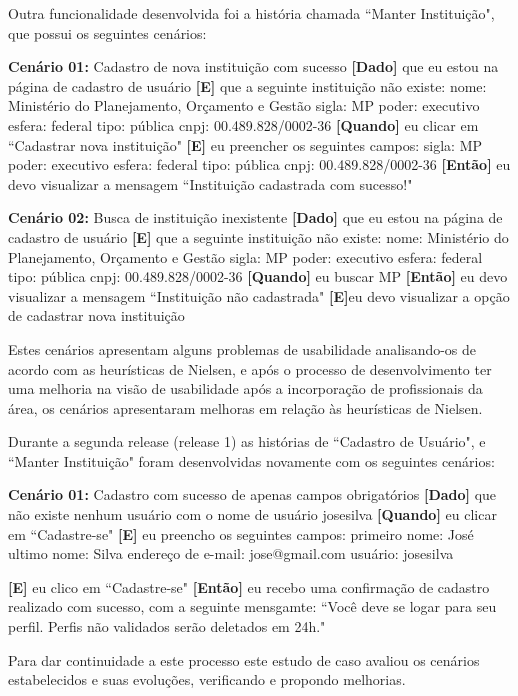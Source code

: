 Outra funcionalidade desenvolvida foi a história chamada ``Manter Instituição", que possui os seguintes cenários:

\textbf{Cenário 01:} Cadastro de nova instituição com sucesso
\textbf{[Dado]} que eu estou na página de cadastro de usuário
\textbf{[E]} que a seguinte instituição não existe:
  	nome: Ministério do Planejamento, Orçamento e Gestão
  	sigla: MP
 	poder: executivo
 	esfera: federal
  	tipo: pública
  	cnpj: 00.489.828/0002-36
\textbf{[Quando]} eu clicar em ``Cadastrar nova instituição" 
\textbf{[E]} eu preencher os seguintes campos:
  	sigla: MP
  	poder: executivo
  	esfera: federal
  	tipo: pública
  	cnpj: 00.489.828/0002-36
\textbf{[Então]} eu devo visualizar a mensagem ``Instituição cadastrada com sucesso!"

\textbf{Cenário 02:} Busca de instituição inexistente
\textbf{[Dado]} que eu estou na página de cadastro de usuário
\textbf{[E]} que a seguinte instituição não existe:
  nome: Ministério do Planejamento, Orçamento e Gestão
  sigla: MP
  poder: executivo
  esfera: federal
  tipo: pública
  cnpj: 00.489.828/0002-36
\textbf{[Quando]} eu buscar MP
\textbf{[Então]} eu devo visualizar a mensagem ``Instituição não cadastrada" 
\textbf{[E]}eu devo visualizar a opção de cadastrar nova instituição

Estes cenários apresentam alguns problemas de usabilidade analisando-os de acordo com as heurísticas de Nielsen, e após o processo de desenvolvimento ter uma melhoria na visão de usabilidade após a incorporação de profissionais da área, os cenários apresentaram melhoras em relação às heurísticas de Nielsen. 

Durante a segunda release (release 1) as histórias de ``Cadastro de Usuário", e ``Manter Instituição" foram desenvolvidas novamente com os seguintes cenários:

\textbf{Cenário 01:} Cadastro com sucesso de apenas campos obrigatórios
	\textbf{[Dado]} que não existe nenhum usuário com o nome de usuário josesilva 
	\textbf{[Quando]} eu clicar em ``Cadastre-se"
	\textbf{[E]} eu preencho os seguintes campos: 
  		primeiro nome: José
  		ultimo nome: Silva
  		endereço de e-mail: jose@gmail.com
  		usuário: josesilva
  		
	\textbf{[E]} eu clico em ``Cadastre-se"
	\textbf{[Então]} eu recebo uma confirmação de cadastro realizado com sucesso, com a seguinte mensgamte: 
	``Você deve se logar para seu perfil. Perfis não validados serão deletados em 24h."


Para dar continuidade a este processo este estudo de caso avaliou os cenários estabelecidos e suas evoluções, verificando e propondo melhorias.

